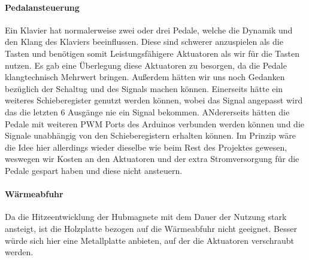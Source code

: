 \paragraph{Pedalansteuerung}
Ein Klavier hat normalerweise zwei oder drei Pedale, welche die Dynamik und den Klang des Klaviers beeinflussen.
Diese sind schwerer anzuspielen als die Tasten und benötigen somit Leistungsfähigere Aktuatoren als wir für die Tasten nutzen.
Es gab eine Überlegung diese Aktuatoren zu besorgen, da die Pedale klangtechnisch Mehrwert bringen.
Außerdem hätten wir uns noch Gedanken bezüglich der Schaltug und des Signals machen können.
Einerseits hätte ein weiteres Schieberegister genutzt werden können, wobei das Signal angepasst wird das die letzten 6 Ausgänge nie ein Signal bekommen.
ANdererseits hätten die Pedale mit weiteren \ac{PWM} Ports des Arduinos verbunden werden können und die Signale unabhängig von den
Schieberegistern erhalten können.
Im Prinzip wäre die Idee hier allerdings wieder dieselbe wie beim Rest des Projektes gewesen,
weswegen wir Kosten an den Aktuatoren und der extra Stromversorgung für die Pedale gespart haben und diese nicht ansteuern.

\paragraph{Wärmeabfuhr}
Da die Hitzeentwicklung der Hubmagnete mit dem Dauer der Nutzung stark ansteigt, ist die Holzplatte bezogen auf die Wärmeabfuhr nicht geeignet.
Besser würde sich hier eine Metallplatte anbieten, auf der die Aktuatoren verschraubt werden.